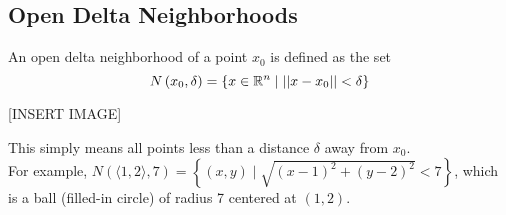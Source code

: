 \subsection{Open Delta Neighborhoods}
\noindent
An open delta neighborhood of a point $x_0$ is defined as the set
\begin{equation*}
	N\left(x_0, \delta\right) = \left\{x \in \mathbb{R}^n \mid \left|\left|x-x_0\right|\right| < \delta\right\}
\end{equation*}

[INSERT IMAGE]

\noindent
This simply means all points less than a distance $\delta$ away from $x_0$.\\
For example, $N(\langle 1, 2\rangle, 7) = \left\{ (x,y) \mid \sqrt{(x-1)^2 + (y-2)^2}<7 \right\}$, which is a ball (filled-in circle) of radius 7 centered at $(1, 2)$.